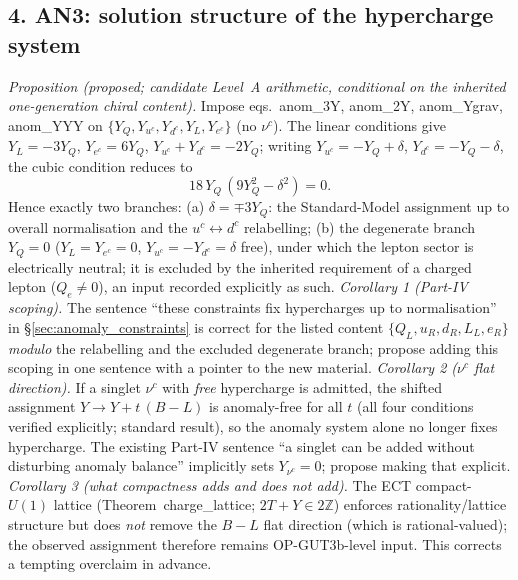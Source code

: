 \subsection*{4. AN3: solution structure of the hypercharge system}
\emph{Proposition (proposed; candidate Level~A arithmetic,
conditional on the inherited one-generation chiral content).}
Impose eqs.~anom\_3Y, anom\_2Y, anom\_Ygrav, anom\_YYY on
$\{Y_Q,Y_{u^c},Y_{d^c},Y_L,Y_{e^c}\}$ (no $\nu^c$).
The linear conditions give $Y_L=-3Y_Q$, $Y_{e^c}=6Y_Q$,
$Y_{u^c}+Y_{d^c}=-2Y_Q$; writing $Y_{u^c}=-Y_Q+\delta$,
$Y_{d^c}=-Y_Q-\delta$, the cubic condition reduces to
\[
18\,Y_Q\,(9Y_Q^2-\delta^2)=0 .
\]
Hence exactly two branches:
(a) $\delta=\mp3Y_Q$: the Standard-Model assignment up to overall
normalisation and the $u^c\!\leftrightarrow\! d^c$ relabelling;
(b) the degenerate branch $Y_Q=0$
($Y_L=Y_{e^c}=0$, $Y_{u^c}=-Y_{d^c}=\delta$ free), under which the
lepton sector is electrically neutral; it is excluded by the
inherited requirement of a charged lepton ($Q_e\neq0$), an input
recorded explicitly as such.
\emph{Corollary 1 (Part-IV scoping).}
The sentence ``these constraints fix hypercharges up to
normalisation'' in \S\ref{sec:anomaly_constraints} is correct for
the listed content $\{Q_L,u_R,d_R,L_L,e_R\}$ \emph{modulo} the
relabelling and the excluded degenerate branch; propose adding this
scoping in one sentence with a pointer to the new material.
\emph{Corollary 2 ($\nu^c$ flat direction).}
If a singlet $\nu^c$ with \emph{free} hypercharge is admitted, the
shifted assignment $Y\to Y+t\,(B{-}L)$ is anomaly-free for all $t$
(all four conditions verified explicitly; standard result), so the
anomaly system alone no longer fixes hypercharge.
The existing Part-IV sentence ``a singlet can be added without
disturbing anomaly balance'' implicitly sets $Y_{\nu^c}=0$; propose
making that explicit.
\emph{Corollary 3 (what compactness adds and does not add).}
The ECT compact-$U(1)$ lattice (Theorem~charge\_lattice;
$2T+Y\in2\mathbb Z$) enforces rationality/lattice structure but does
\emph{not} remove the $B{-}L$ flat direction (which is
rational-valued); the observed assignment therefore remains
OP-GUT3b-level input.
This corrects a tempting overclaim in advance.

